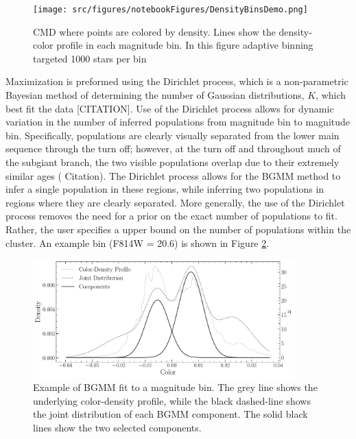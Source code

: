 \begin{figure}
	\centering
	\texttt{[image: src/figures/notebookFigures/DensityBinsDemo.png]}
	\label{fig:densityBinsDemo}
	\caption{CMD where points are colored by density. Lines show the
	density-color profile in each magnitude bin. In this figure adaptive
	binning targeted 1000 stars per bin}
\end{figure}

Maximization is preformed using the Dirichlet process, which is a
non-parametric Bayesian method of determining the number of Gaussian distributions, $K$,
which best fit the data {\color{red}[CITATION]}. Use of the Dirichlet process
allows for dynamic variation in the number of inferred populations from
magnitude bin to magnitude bin. Specifically, populations are clearly visually
separated from the lower main sequence through the turn off; however, at the
turn off and throughout much of the subgiant branch, the two visible
populations overlap due to their extremely similar ages ({\color{red}
Citation}). The Dirichlet process allows for the BGMM method to infer a single
population in these regions, while inferring two populations in regions where
they are clearly separated. More generally, the use of the Dirichlet process
removes the need for a prior on the exact number of populations to fit. Rather,
the user specifies a upper bound on the number of populations within the
cluster. An example bin (F814W = 20.6) is shown in Figure \ref{fig:BGMMDist}.

\begin{figure}
	\centering
	\includegraphics[width=0.9\textwidth]{Notebooks/Figures/BGMMMixingBin.pdf}
	\caption{Example of BGMM fit to a magnitude bin. The grey line shows the
	underlying color-density profile, while the black dashed-line shows the
	joint distribution of each BGMM component. The solid black lines show the
	two selected components.}
	\label{fig:BGMMDist}
\end{figure}

